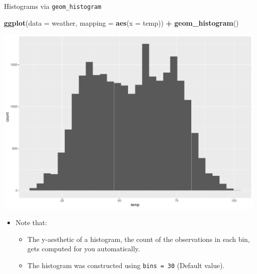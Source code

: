\documentclass[
  ignorenonframetext,
]{beamer}
\newenvironment{Shaded}{\begin{snugshade}}{\end{snugshade}}
\newcommand{\AttributeTok}[1]{\textcolor[rgb]{0.13,0.29,0.53}{#1}}
\newcommand{\FunctionTok}[1]{\textcolor[rgb]{0.13,0.29,0.53}{\textbf{#1}}}
\newcommand{\NormalTok}[1]{#1}
\newcommand{\SpecialCharTok}[1]{\textcolor[rgb]{0.81,0.36,0.00}{\textbf{#1}}}
\providecommand{\tightlist}{%
  \setlength{\itemsep}{0pt}\setlength{\parskip}{0pt}}
\begin{document}
\begin{frame}[fragile]{Histograms via \texttt{geom\_histogram}}
\protect\hypertarget{histograms-via-geom_histogram}{}
\tiny

\begin{Shaded}
\begin{Highlighting}[]
\FunctionTok{ggplot}\NormalTok{(}\AttributeTok{data =}\NormalTok{ weather, }\AttributeTok{mapping =} \FunctionTok{aes}\NormalTok{(}\AttributeTok{x =}\NormalTok{ temp)) }\SpecialCharTok{+}
  \FunctionTok{geom\_histogram}\NormalTok{()}
\end{Highlighting}
\end{Shaded}

\begin{center}\includegraphics[width=0.7\linewidth,height=0.5\textheight]{Week2_Lect_files/figure-beamer/unnamed-chunk-26-1} \end{center}
\normalsize

\begin{itemize}
\item
  Note that:

  \begin{itemize}
  \tightlist
  \item
    The y-aesthetic of a histogram, the count of the observations in
    each bin, gets computed for you automatically.
  \item
    The histogram was constructed using \texttt{bins\ =\ 30} (Default
    value).
  \end{itemize}
\end{itemize}
\end{frame}
\end{document}
